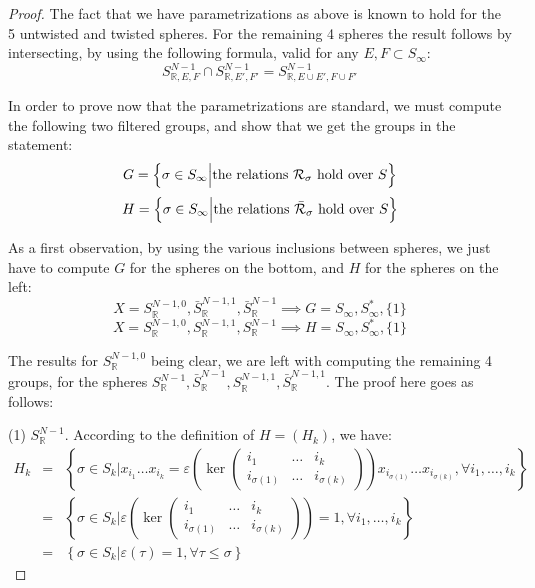 \documentclass[12pt]{amsbook}
\begin{document}
\begin{proof}
The fact that we have parametrizations as above is known to hold for the 5 untwisted and twisted spheres. For the remaining 4 spheres the result follows by intersecting, by using the following formula, valid for any $E,F\subset S_\infty$:
$$S^{N-1}_{\mathbb R,E,F}\cap S^{N-1}_{\mathbb R,E',F'}=S^{N-1}_{\mathbb R,E\cup E',F\cup F'}$$

In order to prove now that the parametrizations are standard, we must compute the following two filtered groups, and show that we get the groups in the statement:
$$G=\left\{\sigma\in S_\infty\Big|{\rm the\ relations\ }\mathcal R_\sigma\ {\rm hold\ over\ }S\right\}$$ 
$$H=\left\{\sigma\in S_\infty\Big|{\rm the\ relations\ }\bar{\mathcal R}_\sigma\ {\rm hold\ over\ }S\right\}$$ 

As a first observation, by using the various inclusions between spheres, we just have to compute $G$ for the spheres on the bottom, and $H$ for the spheres on the left:
$$X=S^{N-1,0}_\mathbb R,\bar{S}^{N-1,1}_\mathbb R,\bar{S}^{N-1}_\mathbb R\implies G=S_\infty,S_\infty^*,\{1\}$$
$$X=S^{N-1,0}_\mathbb R,S^{N-1,1}_\mathbb R,S^{N-1}_\mathbb R\implies H=S_\infty,S_\infty^*,\{1\}$$

The results for $S^{N-1,0}_\mathbb R$ being clear, we are left with computing the remaining 4 groups, for the spheres $S^{N-1}_\mathbb R,\bar{S}^{N-1}_\mathbb R,S^{N-1,1}_\mathbb R,\bar{S}^{N-1,1}_\mathbb R$. The proof here goes as follows:

\medskip

(1) $S^{N-1}_\mathbb R$. According to the definition of $H=(H_k)$, we have:
\begin{eqnarray*}
H_k
&=&\left\{\sigma\in S_k\Big|x_{i_1}\ldots x_{i_k}=\varepsilon\left(
\ker\begin{pmatrix}i_1&\ldots&i_k\\
i_{\sigma(1)}&\ldots&i_{\sigma(k)}
\end{pmatrix}\right)
x_{i_{\sigma(1)}}\ldots x_{i_{\sigma(k)}},\forall i_1,\ldots,i_k\right\}\\
&=&\left\{\sigma\in S_k\Big|
\varepsilon\left(
\ker\begin{pmatrix}i_1&\ldots&i_k\\
i_{\sigma(1)}&\ldots&i_{\sigma(k)}
\end{pmatrix}\right)
=1,\forall i_1,\ldots,i_k\right\}\\
&=&\left\{\sigma\in S_k\Big|\varepsilon(\tau)=1,\forall\tau\leq\sigma\right\}\end{eqnarray*}


\end{proof}
\end{document}
